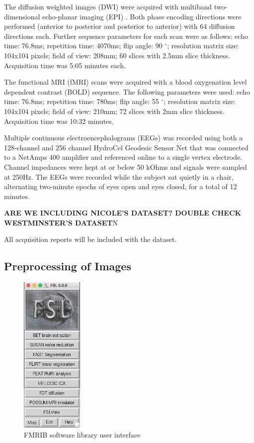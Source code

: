 The diffusion weighted images (DWI) were acquired with multiband two-dimensional echo-planar imaging (EPI) \cite{ref:epi}. Both phase encoding directions were performed (anterior to posterior and posterior to anterior) with 64 diffusion directions each. Further sequence parameters for each scan were as follows: echo time: 76.8ms; repetition time: 4070ms; flip angle: 90 $^{\circ}$; resolution matrix size: 104x104 pixels; field of view: 208mm; 60 slices with 2.5mm slice thickness. Acquisition time was 5:05 minutes each.

The functional MRI (fMRI) scans were acquired with a blood oxygenation level dependent contrast (BOLD) sequence. The following parameters were used: echo time: 76.8ms; repetition time: 780ms; flip angle: 55 $^{\circ}$; resolution matrix size: 104x104 pixels; field of view: 210mm; 72 slices with 2mm slice thickness. Acquisition time was 10:32 minutes.

Multiple continuous electroencephalograms (EEGs) was recorded using both a 128-channel and 256 channel HydroCel Geodesic Sensor Net that was connected to a NetAmps 400 amplifier and referenced online to a single vertex electrode. Channel impedances were kept at or below 50 kOhms and signals were sampled at 250Hz. The EEGs were recorded while the subject sat quietly in a chair, alternating two-minute epochs of eyes open and eyes closed, for a total of 12 minutes.

\textbf{ARE WE INCLUDING NICOLE'S DATASET? DOUBLE CHECK WESTMINSTER'S DATASET}N

All acquisition reports will be included with the dataset.

\subsection{Preprocessing of Images}
\label{sec:preprocess}

\begin{figure}
    \centering
    \vspace{-63pt}
    \includegraphics[width=3cm]{Figures/FSL}
    \caption{FMRIB software library user interface}
    \label{fig:fsl}
\end{figure}

